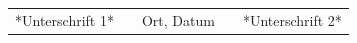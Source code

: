 \begin{titlepage}
	\vspace{1.6cm}
	\begin{table}[h]
		\centering
			\begin{tabularx}{\textwidth}{lXcXr}
			\hline
	  	*Unterschrift 1* & & Ort, Datum & & *Unterschrift 2* \\
			\end{tabularx}
	\end{table}
\end{titlepage}
